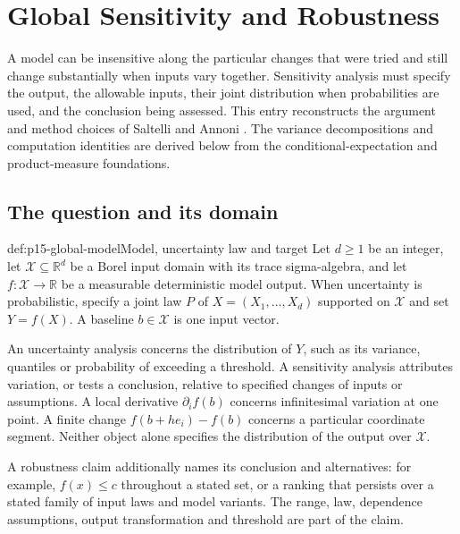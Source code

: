 \chapter{Global Sensitivity and Robustness}
\label{sec:p15-global-sensitivity}

A model can be insensitive along the particular changes that were tried
and still change substantially when inputs vary together.
Sensitivity analysis must specify the output, the allowable inputs,
their joint distribution when probabilities are used, and the conclusion
being assessed. This entry reconstructs the argument and method choices
of Saltelli and Annoni \cite{SaltelliAnnoni2010Sensitivity}.
The variance decompositions and computation identities are derived below
from the conditional-expectation and product-measure foundations.

\section{The question and its domain}

\begin{hbdefinition}{def:p15-global-model}{Model, uncertainty law and target}
Let \(d\geq1\) be an integer, let \(\mathcal X\subseteq\mathbb R^d\)
be a Borel input domain with its trace sigma-algebra, and let
\(f:\mathcal X\to\mathbb R\) be a measurable
deterministic model output. When uncertainty is probabilistic, specify
a joint law \(P\) of \(X=(X_1,\ldots,X_d)\) supported on \(\mathcal X\)
and set \(Y=f(X)\). A baseline \(b\in\mathcal X\) is one input vector.

An uncertainty analysis concerns the distribution of \(Y\), such as
its variance, quantiles or probability of exceeding a threshold.
A sensitivity analysis attributes variation, or tests a conclusion,
relative to specified changes of inputs or assumptions.
A local derivative \(\partial_i f(b)\) concerns infinitesimal variation
at one point. A finite change \(f(b+he_i)-f(b)\) concerns a particular
coordinate segment. Neither object alone specifies the distribution
of the output over \(\mathcal X\).

A robustness claim additionally names its conclusion and alternatives:
for example, \(f(x)\leq c\) throughout a stated set, or a ranking that
persists over a stated family of input laws and model variants.
The range, law, dependence assumptions, output transformation and
threshold are part of the claim.
\end{hbdefinition}

